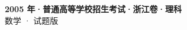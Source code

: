 \documentclass[zihao=-4, a4paper]{ctexart}
\begin{document}
\begin{center}
  {\Large\bfseries 2005 年·普通高等学校招生考试·浙江卷·理科}\\[4pt]
  {\large 数学 · 试题版}
\end{center}
\medskip
{}

\end{document}
